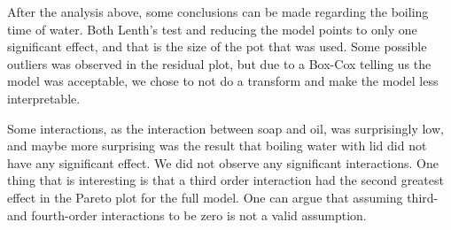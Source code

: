 

After the analysis above, some conclusions can be made regarding the boiling time of water. Both Lenth's test and reducing the model points to only one significant effect, and that is the size of the pot that was used. Some possible outliers was observed in the residual plot, but due to a Box-Cox telling us the model was acceptable, we chose to not do a transform and make the model less interpretable.

Some interactions, as the interaction between soap and oil, was surprisingly low, and maybe more surprising was the result that boiling water with lid did not have any significant effect. We did not observe any significant interactions. One thing that is interesting is that a third order interaction had the second greatest effect in the Pareto plot for the full model. One can argue that assuming third- and fourth-order interactions to be zero is not a valid assumption.